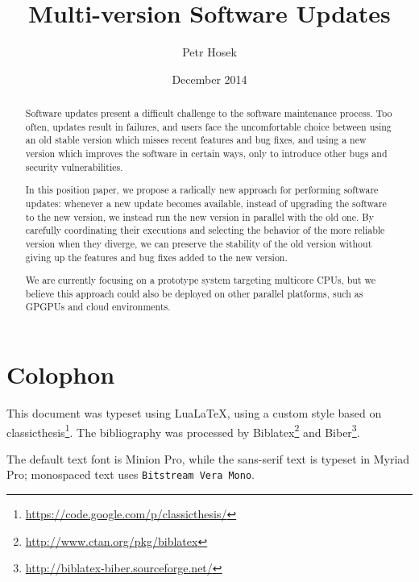 \documentclass[a4paper,12pt,oneside,minionpro,dottedtoc]{thesis}
\title{Multi-version Software Updates}
\author{Petr Hosek}
\date{December 2014}
\begin{document}
\maketitle

\section*{Colophon}

This document was typeset using Lua\LaTeX, using a custom style based on
\textsf{classicthesis}\footnote{\url{https://code.google.com/p/classicthesis/}}.
The bibliography was processed by
Biblatex\footnote{\url{http://www.ctan.org/pkg/biblatex}} and
Biber\footnote{\url{http://biblatex-biber.sourceforge.net/}}.

The default text font is Minion Pro, while the sans-serif text is typeset in
\textsf{Myriad Pro}; monospaced text uses \texttt{Bitstream Vera Mono}.

\preface
\begin{abstract}
Software updates present a difficult challenge to the software
maintenance process.  Too often, updates result in failures, and users
face the uncomfortable choice between using an old stable version
which misses recent features and bug fixes, and using a new version
which improves the software in certain ways, only to introduce other
bugs and security vulnerabilities.

In this position paper, we propose a radically new approach for
performing software updates: whenever a new update becomes available,
instead of upgrading the software to the new version, we instead
run the new version in parallel with the old one.  By carefully
coordinating their executions and selecting the behavior of the more
reliable version when they diverge, we can preserve the stability of
the old version without giving up the features and bug fixes added to
the new version.

We are currently focusing on a prototype system targeting multicore
CPUs, but we believe this approach could also be deployed on other
parallel platforms, such as GPGPUs and cloud environments.
\end{abstract}

\makededication

\tableofcontents
\listoftables
\listoffigures
\listoflistings

\body











{
  \printbibliography
}

\appendix
\end{document}
